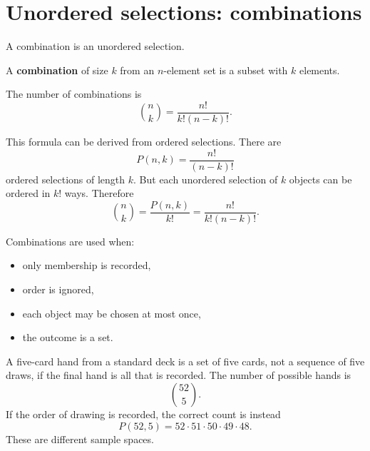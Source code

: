 \section{Unordered selections: combinations}

A combination is an unordered selection.

\begin{definitionbox}
A \textbf{combination} of size \(k\) from an \(n\)-element set is a subset with \(k\) elements.
\end{definitionbox}

The number of combinations is
\[
\binom{n}{k}=\frac{n!}{k!(n-k)!}.
\]

This formula can be derived from ordered selections. There are
\[
P(n,k)=\frac{n!}{(n-k)!}
\]
ordered selections of length \(k\). But each unordered selection of \(k\) objects can be ordered in \(k!\) ways. Therefore
\[
\binom{n}{k}=\frac{P(n,k)}{k!}=\frac{n!}{k!(n-k)!}.
\]

Combinations are used when:
\begin{itemize}
    \item only membership is recorded,
    \item order is ignored,
    \item each object may be chosen at most once,
    \item the outcome is a set.
\end{itemize}

\begin{examplebox}
A five-card hand from a standard deck is a set of five cards, not a sequence of five draws, if the final hand is all that is recorded. The number of possible hands is
\[
\binom{52}{5}.
\]
If the order of drawing is recorded, the correct count is instead
\[
P(52,5)=52\cdot 51\cdot 50\cdot 49\cdot 48.
\]
These are different sample spaces.
\end{examplebox}
